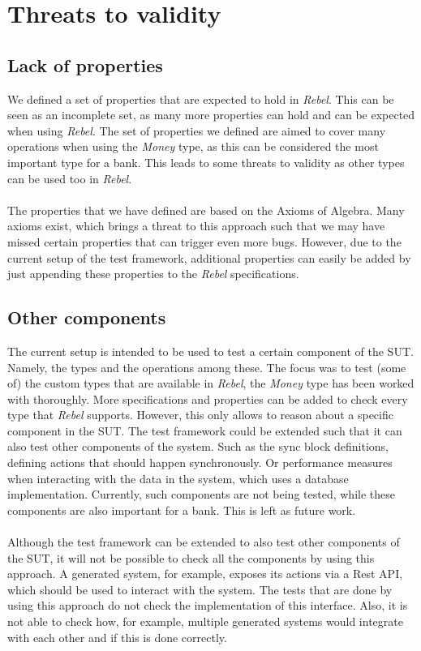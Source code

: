 \section{Threats to validity}
\subsection*{Lack of properties}
We defined a set of properties that are expected to hold in \textit{Rebel}. This can be seen as an incomplete set, as many more properties can hold and can be expected when using \textit{Rebel}. The set of properties we defined are aimed to cover many operations when using the \textit{Money} type, as this can be considered the most important type for a bank. This leads to some threats to validity as other types can be used too in \textit{Rebel}.\\
\\
The properties that we have defined are based on the Axioms of Algebra. Many axioms exist, which brings a threat to this approach such that we may have missed certain properties that can trigger even more bugs. However, due to the current setup of the test framework, additional properties can easily be added by just appending these properties to the \textit{Rebel} specifications.

\subsection*{Other components}
The current setup is intended to be used to test a certain component of the SUT. Namely, the types and the operations among these. The focus was to test (some of) the custom types that are available in \textit{Rebel}, the \textit{Money} type has been worked with thoroughly. More specifications and properties can be added to check every type that \textit{Rebel} supports. However, this only allows to reason about a specific component in the SUT. The test framework could be extended such that it can also test other components of the system. Such as the sync block definitions, defining actions that should happen synchronously. Or performance measures when interacting with the data in the system, which uses a database implementation. Currently, such components are not being tested, while these components are also important for a bank. This is left as future work.\\
\\
Although the test framework can be extended to also test other components of the SUT, it will not be possible to check all the components by using this approach. A generated system, for example, exposes its actions via a Rest API, which should be used to interact with the system. The tests that are done by using this approach do not check the implementation of this interface. Also, it is not able to check how, for example, multiple generated systems would integrate with each other and if this is done correctly.

